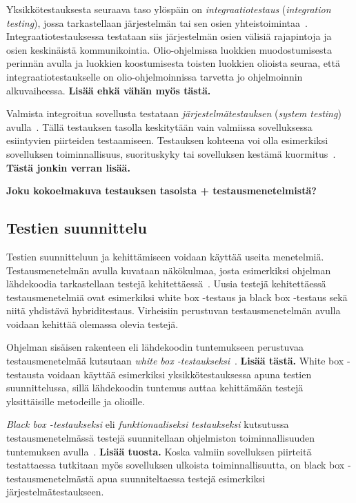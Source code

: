 \documentclass[finnish, grading]{tktltiki2}
\theoremstyle{definition}
\theoremstyle{remark}
\begin{document}
Yksikkötestauksesta seuraava taso ylöspäin on \textit{integraatiotestaus} (\textit{integration testing}), jossa tarkastellaan järjestelmän tai sen osien yhteistoimintaa~\cite[s. 45]{Binder:1999}. Integraatiotestauksessa testataan siis järjestelmän osien välisiä rajapintoja ja osien keskinäistä kommunikointia. Olio-ohjelmissa luokkien muodostumisesta perinnän avulla ja luokkien koostumisesta toisten luokkien olioista seuraa, että integraatiotestaukselle on olio-ohjelmoinnissa tarvetta jo ohjelmoinnin alkuvaiheessa. 
\textbf{Lisää ehkä vähän myös tästä.}

Valmista integroitua sovellusta testataan \textit{järjestelmätestauksen} (\textit{system testing}) avulla~\cite[s. 45]{Binder:1999}. Tällä testauksen tasolla keskitytään vain valmiissa sovelluksessa esiintyvien piirteiden testaamiseen. Testauksen kohteena voi olla esimerkiksi sovelluksen toiminnallisuus, suorituskyky tai sovelluksen kestämä kuormitus~\cite[s. 45]{Binder:1999}. 
\textbf{Tästä jonkin verran lisää.}

\textbf{Joku kokoelmakuva testauksen tasoista + testausmenetelmistä?}

\subsection{Testien suunnittelu}

Testien suunnitteluun ja kehittämiseen voidaan käyttää useita menetelmiä. Testausmenetelmän avulla kuvataan näkökulmaa, josta esimerkiksi ohjelman lähdekoodia tarkastellaan testejä kehitettäessä~\cite[s. 51]{Binder:1999}. Uusia testejä kehitettäessä testausmenetelmiä ovat esimerkiksi white box -testaus ja black box -testaus sekä niitä yhdistävä hybriditestaus. Virheisiin perustuvan testausmenetelmän avulla voidaan kehittää olemassa olevia testejä.

Ohjelman sisäisen rakenteen eli lähdekoodin tuntemukseen perustuvaa testausmenetelmää kutsutaan \textit{white box -testaukseksi}~\cite[s. 52]{Binder:1999}. \textbf{Lisää tästä.} White box -testausta voidaan käyttää esimerkiksi yksikkötestauksessa apuna testien suunnittelussa, sillä lähdekoodin tuntemus auttaa kehittämään testejä yksittäisille metodeille ja olioille.

\textit{Black box -testaukseksi} eli \textit{funktionaaliseksi testaukseksi} kutsutussa testausmenetelmässä testejä suunnitellaan ohjelmiston toiminnallisuuden tuntemuksen avulla~\cite[s. 52]{Binder:1999}. \textbf{Lisää tuosta.} Koska valmiin sovelluksen piirteitä testattaessa tutkitaan myös sovelluksen ulkoista toiminnallisuutta, on black box -testausmenetelmästä apua suunniteltaessa testejä esimerkiksi järjestelmätestaukseen.
\end{document}
